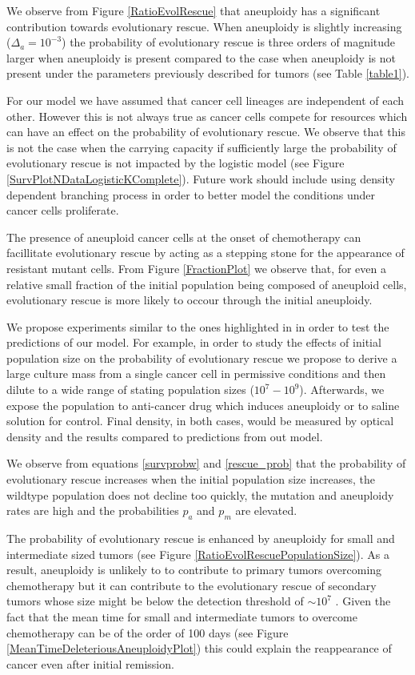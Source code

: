 \documentclass[12pt]{extarticle}
\begin{document}
We observe from Figure \ref{RatioEvolRescue} that aneuploidy has a significant contribution towards evolutionary rescue. When aneuploidy is slightly increasing ($\Delta_a=10^{-3}$) the probability of evolutionary rescue is three orders of magnitude larger when aneuploidy is present compared to the case when aneuploidy is not present under the parameters previously described for tumors (see Table \ref{table1}).

For our model we have assumed that cancer cell lineages are independent of each other. However this is not always true as cancer cells compete for resources which can have an effect on the probability of evolutionary rescue. We observe that this is not the case when the carrying capacity if sufficiently large the probability of evolutionary rescue is not impacted by the logistic model (see Figure \ref{SurvPlotNDataLogisticKComplete}). Future work should include using density dependent branching process in order to better model the conditions under cancer cells proliferate.

The presence of aneuploid cancer cells at the onset of chemotherapy can facillitate evolutionary rescue by acting as a stepping stone for the appearance of resistant mutant cells. From Figure \ref{FractionPlot} we observe that, for even a relative small fraction of the initial population being composed of aneuploid cells, evolutionary rescue is more likely to occour through the initial aneuploidy.

We propose experiments similar to the ones highlighted in \citep{martin2013probability} in order to test the predictions of our model. For example, in order to study the effects of initial population size on the probability of evolutionary rescue we propose to derive a large culture mass from a single cancer cell in permissive conditions and then dilute to a wide range of stating population sizes ($10^7-10^9$). Afterwards, we expose the population to anti-cancer drug which induces aneuploidy or to saline solution for control. Final density, in both cases, would be measured by optical density and the results compared to predictions from out model.

We observe from equations \eqref{survprobw} and \eqref{rescue_prob} that the probability of evolutionary rescue increases when the initial population size increases, the wildtype population does not decline too quickly, the mutation and aneuploidy rates are high and the probabilities $p_a$ and $p_m$ are elevated.

The probability of evolutionary rescue is enhanced by aneuploidy for small and intermediate sized tumors (see Figure \ref{RatioEvolRescuePopulationSize}). As a result, aneuploidy is unlikely to to contribute to primary tumors overcoming chemotherapy but it can contribute to the evolutionary rescue of secondary tumors whose size might be below the detection threshold of $\sim10^7$  \citep{bozic2013evolutionary}. Given the fact that the mean time for small and intermediate tumors to overcome chemotherapy can be of the order of 100 days (see Figure \ref{MeanTimeDeleteriousAneuploidyPlot})  this could explain the reappearance of cancer even after initial remission.
\end{document}
